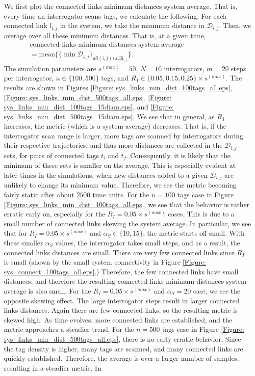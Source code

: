 We first plot the connected links minimum distances system average. That is, every time an interrogator scans tags, we calculate the following. For each connected link $l_{i,j}$ in the system, we take the minimum distance in $\mathcal{D}_{i,j}$. Then, we average over all these minimum distances. That is, at a given time,
\begin{eqnarray}
\mbox{connected links minimum distances system average} \hspace{1in} \nonumber \\
= \mbox{mean} \{ \{\min \mathcal{D}_{i,j}\}_{all \left(i,j\right) s.t. \exists l_{i,j}} \}.
\end{eqnarray}
The simulation parameters are $s^{(max)} = 50$, $N = 10$ interrogators, $m = 20$ steps per interrogator, $n \in \{100, 500\}$ tags, and $R_I \in \{0.05, 0.15, 0.25\} \times s^{(max)}$. The results are shown in Figures \ref{Figure: sys_links_min_dist_100tags_all.eps}, \ref{Figure: sys_links_min_dist_500tags_all.eps}, \ref{Figure: sys_links_min_dist_100tags_15diam.eps}, and \ref{Figure: sys_links_min_dist_500tags_15diam.eps}. We see that in general, as $R_I$ increases, the metric (which is a system average) decreases. That is, if the interrogator scan range is larger, more tags are scanned by interrogators during their respective trajectories, and thus more distances are collected in the $\mathcal{D}_{i,j}$ sets, for pairs of connected tags $t_i$ and $t_j$. Consequently, it is likely that the minimum of these sets is smaller on the average. This is especially evident at later times in the simulations, when new distances added to a given $\mathcal{D}_{i,j}$ are unlikely to change its minimum value. Therefore, we see the metric becoming fairly static after about $2500$ time units. For the $n = 100$ tags case in Figure \ref{Figure: sys_links_min_dist_100tags_all.eps}, we see that the behavior is rather erratic early on, especially for the $R_I = 0.05 \times s^{(max)}$ cases. This is due to a small number of connected links skewing the system average. In particular, we see that for $R_I = 0.05 \times s^{(max)}$ and $\alpha_S \in \{10, 15\}$, the metric starts off small. With these smaller $\alpha_S$ values, the interrogator takes small steps, and as a result, the connected links distances are small. There are very few connected links since $R_I$ is small (shown by the small system connectivity in Figure \ref{Figure: sys_connect_100tags_all.eps}.) Therefore, the few connected links have small distances, and therefore the resulting connected links minimum distances system average is also small. For the $R_I = 0.05 \times s^{(max)}$ and $\alpha_S =  20$ case, we see the opposite skewing effect. The large interrogator steps result in larger connected links distances. Again there are few connected links, so the resulting metric is skewed high. As time evolves, more connected links are established, and the metric approaches a steadier trend. For the $n=500$ tags case in Figure \ref{Figure: sys_links_min_dist_500tags_all.eps}, there is no early erratic behavior. Since the tag density is higher, many tags are scanned, and many connected links are quickly established. Therefore, the average is over a larger number of samples, resulting in a steadier metric. In 